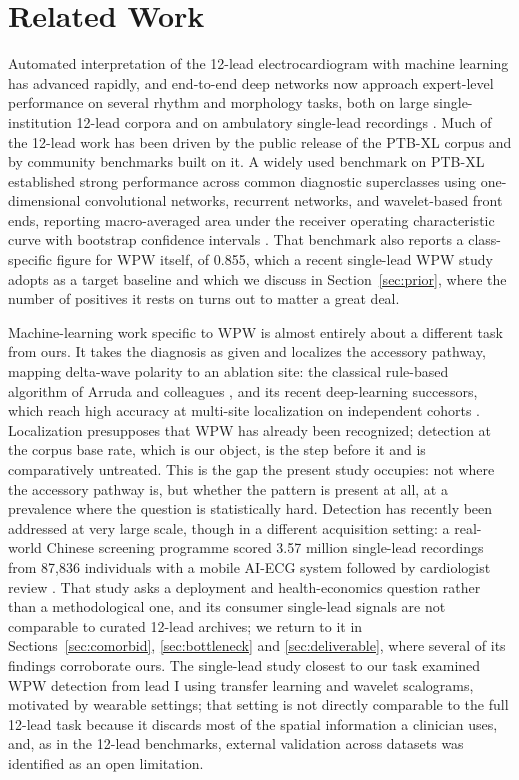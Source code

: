 \documentclass[11pt]{article}
\begin{document}
\FloatBarrier
\section{Related Work}

Automated interpretation of the 12-lead electrocardiogram with machine learning has advanced rapidly, and end-to-end deep networks now approach expert-level performance on several rhythm and morphology tasks, both on large single-institution 12-lead corpora \cite{ribeiro} and on ambulatory single-lead recordings \cite{hannun}. Much of the 12-lead work has been driven by the public release of the PTB-XL corpus \cite{ptbxl} and by community benchmarks built on it. A widely used benchmark on PTB-XL established strong performance across common diagnostic superclasses using one-dimensional convolutional networks, recurrent networks, and wavelet-based front ends, reporting macro-averaged area under the receiver operating characteristic curve with bootstrap confidence intervals \cite{strodthoff}. That benchmark also reports a class-specific figure for WPW itself, of 0.855, which a recent single-lead WPW study adopts as a target baseline \cite{leadi} and which we discuss in Section~\ref{sec:prior}, where the number of positives it rests on turns out to matter a great deal.

Machine-learning work specific to WPW is almost entirely about a different task from ours. It takes the diagnosis as given and localizes the accessory pathway, mapping delta-wave polarity to an ablation site: the classical rule-based algorithm of Arruda and colleagues \cite{arruda}, and its recent deep-learning successors, which reach high accuracy at multi-site localization on independent cohorts \cite{hennecken,senoner}. Localization presupposes that WPW has already been recognized; detection at the corpus base rate, which is our object, is the step before it and is comparatively untreated. This is the gap the present study occupies: not where the accessory pathway is, but whether the pattern is present at all, at a prevalence where the question is statistically hard. Detection has recently been addressed at very large scale, though in a different acquisition setting: a real-world Chinese screening programme scored 3.57 million single-lead recordings from 87{,}836 individuals with a mobile AI-ECG system followed by cardiologist review \cite{huang}. That study asks a deployment and health-economics question rather than a methodological one, and its consumer single-lead signals are not comparable to curated 12-lead archives; we return to it in Sections~\ref{sec:comorbid}, \ref{sec:bottleneck} and \ref{sec:deliverable}, where several of its findings corroborate ours. The single-lead study closest to our task \cite{leadi} examined WPW detection from lead I using transfer learning and wavelet scalograms, motivated by wearable settings; that setting is not directly comparable to the full 12-lead task because it discards most of the spatial information a clinician uses, and, as in the 12-lead benchmarks, external validation across datasets was identified as an open limitation.
\end{document}
